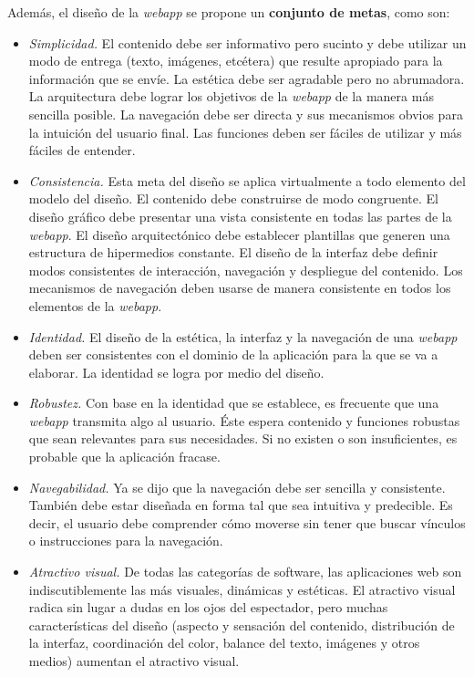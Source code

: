 \documentclass[a4paper,oneside,11pt]{book}
\begin{document}
		Además, el diseño de la \textit{webapp} se propone un \textbf{conjunto de metas}, como son:
		\begin{itemize}
			\item \textit{Simplicidad.} El contenido debe ser informativo pero sucinto y debe utilizar un modo de entrega (texto, imágenes, etcétera) que resulte apropiado para la información que se envíe. La estética debe ser agradable pero no abrumadora. La arquitectura debe lograr los objetivos de la \textit{webapp} de la manera más sencilla posible. La navegación debe ser directa y sus mecanismos obvios para la intuición del usuario final. Las funciones deben ser fáciles de utilizar y más fáciles de entender.
			\item \textit{Consistencia.} Esta meta del diseño se aplica virtualmente a todo elemento del modelo del diseño. El contenido debe construirse de modo congruente. El diseño gráfico debe presentar una vista consistente en todas las partes de la \textit{webapp}. El diseño arquitectónico debe establecer plantillas que generen una estructura de hipermedios constante. El diseño de la interfaz debe definir modos consistentes de interacción, navegación y despliegue del contenido. Los mecanismos de navegación deben usarse de manera consistente en todos los elementos de la \textit{webapp}.
			\item \textit{Identidad.} El diseño de la estética, la interfaz y la navegación de una \textit{webapp} deben ser consistentes con el dominio de la aplicación para la que se va a elaborar. La identidad se logra por medio del diseño.
			\item \textit{Robustez.} Con base en la identidad que se establece, es frecuente que una \textit{webapp} transmita algo al usuario. Éste espera contenido y funciones robustas que sean relevantes para sus necesidades. Si no existen o son insuficientes, es probable que la aplicación fracase.
			\item \textit{Navegabilidad.} Ya se dijo que la navegación debe ser sencilla y consistente. También debe estar diseñada en forma tal que sea intuitiva y predecible. Es decir, el usuario debe comprender cómo moverse sin tener que buscar vínculos o instrucciones para la navegación.
			\item \textit{Atractivo visual.} De todas las categorías de software, las aplicaciones web son indiscutiblemente las más visuales, dinámicas y estéticas. El atractivo visual radica sin lugar a dudas en los ojos del espectador, pero muchas características del diseño (aspecto y sensación del contenido, distribución de la interfaz, coordinación del color, balance del texto, imágenes y otros medios) aumentan el atractivo visual.
		\end{itemize}
		
\end{document}
